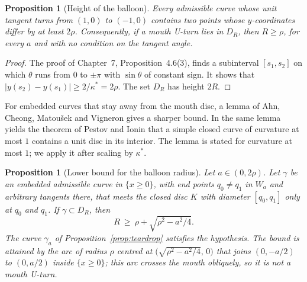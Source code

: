 \documentclass[11pt,reqno]{amsart}
\newtheorem{proposition}[theorem]{Proposition}
\theoremstyle{definition}
\numberwithin{equation}{section}
\providecommand{\xref}[2]{#2}
\begin{document}
\begin{proposition}[Height of the balloon]
\label{prop:balloon_height}
Every admissible curve whose unit tangent turns from $(1,0)$ to $(-1,0)$ contains two points whose $y$-coordinates differ by at least $2\rho$. Consequently, if a mouth U-turn lies in $D_R$, then $R\ge\rho$, for every $a$ and with no condition on the tangent angle.
\end{proposition}

\begin{proof}
The proof of Chapter~7, Proposition~\xref{chap07:thm:lower_bounds}{4.6}(3), finds a subinterval $[s_1,s_2]$ on which $\theta$ runs from $0$ to $\pm\pi$ with $\sin\theta$ of constant sign. It shows that $|y(s_2)-y(s_1)|\ge2/\kappa^*=2\rho$. The set $D_R$ has height $2R$.
\end{proof}

For embedded curves that stay away from the mouth disc, a lemma of Ahn, Cheong, Matou\v{s}ek and Vigneron \cite[Lemma~2]{ahn2012reachability} gives a sharper bound. In \cite{ahn2012reachability} the same lemma yields the theorem of Pestov and Ionin that a simple closed curve of curvature at most $1$ contains a unit disc in its interior. The lemma is stated for curvature at most $1$; we apply it after scaling by $\kappa^*$.

\begin{proposition}[Lower bound for the balloon radius]
\label{prop:teardrop_lower}
Let $a\in(0,2\rho)$. Let $\gamma$ be an embedded admissible curve in $\{x\ge0\}$, with end points $q_0\ne q_1$ in $W_a$ and arbitrary tangents there, that meets the closed disc $K$ with diameter $[q_0,q_1]$ only at $q_0$ and $q_1$. If $\gamma\subset D_R$, then
\[
R\ \ge\ \rho+\sqrt{\rho^2-a^2/4}.
\]
The curve $\gamma_a$ of Proposition~\ref{prop:teardrop} satisfies the hypothesis. The bound is attained by the arc of radius $\rho$ centred at $\bigl(\sqrt{\rho^2-a^2/4},\,0\bigr)$ that joins $(0,-a/2)$ to $(0,a/2)$ inside $\{x\ge0\}$; this arc crosses the mouth obliquely, so it is not a mouth U-turn.
\end{proposition}
\end{document}
